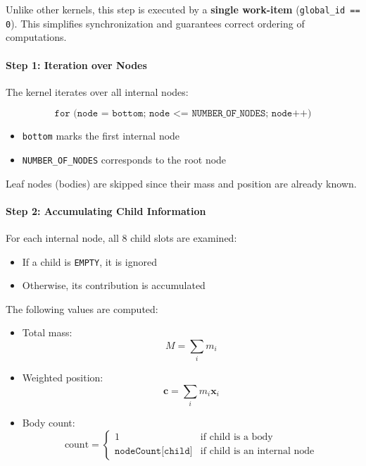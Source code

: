 \documentclass[12pt]{article}
\begin{document}
Unlike other kernels, this step is executed by a \textbf{single work-item}
(\texttt{global\_id == 0}). This simplifies synchronization and guarantees
correct ordering of computations.

\paragraph{Step 1: Iteration over Nodes}

The kernel iterates over all internal nodes:

\[
\texttt{for (node = bottom; node <= NUMBER\_OF\_NODES; node++)}
\]

\begin{itemize}
    \item \texttt{bottom} marks the first internal node
    \item \texttt{NUMBER\_OF\_NODES} corresponds to the root node
\end{itemize}

Leaf nodes (bodies) are skipped since their mass and position are already known.

\paragraph{Step 2: Accumulating Child Information}

For each internal node, all 8 child slots are examined:

\begin{itemize}
    \item If a child is \texttt{EMPTY}, it is ignored
    \item Otherwise, its contribution is accumulated
\end{itemize}

The following values are computed:

\begin{itemize}
    \item Total mass:
    \[
    M = \sum_i m_i
    \]
    
    \item Weighted position:
    \[
    \mathbf{c} = \sum_i m_i \mathbf{x}_i
    \]
    
    \item Body count:
    \[
    \text{count} =
    \begin{cases}
        1 & \text{if child is a body} \\
        \texttt{nodeCount[child]} & \text{if child is an internal node}
    \end{cases}
    \]
\end{itemize}
\end{document}
